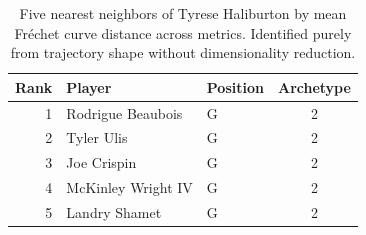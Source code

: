 \begin{table}[htbp]
  \centering\small
  \begin{tabular}{rllc}
    \toprule
    Rank & Player & Position & Archetype \\
    \midrule
    1 & Rodrigue Beaubois & G & 2 \\
    2 & Tyler Ulis & G & 2 \\
    3 & Joe Crispin & G & 2 \\
    4 & McKinley Wright IV & G & 2 \\
    5 & Landry Shamet & G & 2 \\
    \bottomrule
  \end{tabular}
  \caption{Five nearest neighbors of Tyrese Haliburton by mean Fr\'{e}chet curve distance across metrics. Identified purely from trajectory shape without dimensionality reduction.}
  \label{tab:Tyrese_Haliburton_frechet_curve_neighbors}
\end{table}

